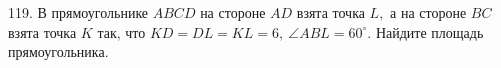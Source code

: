 119. В прямоугольнике $ABCD$ на стороне $AD$ взята точка $L,$ а на стороне $BC$ взята точка $K$ так, что $KD=DL=KL=6,\ \angle ABL=60^\circ.$ Найдите площадь прямоугольника.\\
